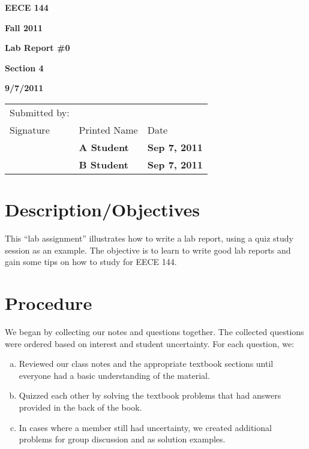 \documentclass[12pt]{article}
\begin{document}

\centerline{\bf EECE 144}
\centerline{\bf Fall 2011}
\centerline{\bf}
\centerline{\bf Lab Report \#0}
\centerline{\bf Section 4}
\centerline{\bf 9/7/2011}

\begin{center}
\begin{tabularx}{\textwidth}[b]{X X l}
Submitted by: & & \\
Signature & Printed Name & Date \\
\hline
\multicolumn{1}{|X|}{} & \multicolumn{1}{|l|}{\bigstrut \bf A Student} & \multicolumn{1}{|l|}{\bf Sep 7, 2011} \\
\hline
\multicolumn{1}{|X|}{} & \multicolumn{1}{|l|}{\bigstrut \bf B Student} & \multicolumn{1}{|l|}{\bf Sep 7, 2011} \\
\hline
\end{tabularx}
\end{center}

\section{Description/Objectives}

This “lab assignment” illustrates how to write a lab report, using a quiz study
session as an example. The objective is to learn to write good lab reports and
gain some tips on how to study for EECE 144.

\section{Procedure}

We began by collecting our notes and questions together. The collected
questions were ordered based on interest and student uncertainty.
For each question, we:

\begin{enumerate}[a.]
\item Reviewed our class notes and the appropriate textbook sections until
everyone had a basic understanding of the material.
\item Quizzed each other by solving the textbook problems that had answers
provided in the back of the book.
\item In cases where a member still had uncertainty, we created additional
problems for group discussion and as solution examples.
\end{enumerate}
\end{document}

